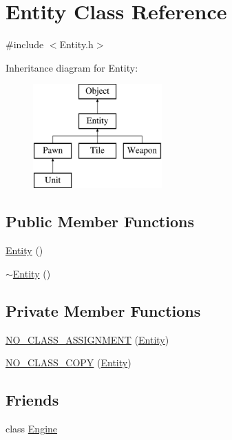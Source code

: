 \section{Entity Class Reference}
\label{class_entity}


{\ttfamily \#include $<$Entity.\-h$>$}

Inheritance diagram for Entity\-:\begin{figure}[H]
\begin{center}
\leavevmode
\includegraphics[height=4.000000cm]{class_entity}
\end{center}
\end{figure}
\subsection*{Public Member Functions}
\begin{DoxyCompactItemize}
\item 
\hyperlink{class_entity_a980f368aa07ce358583982821533a54a}{Entity} ()
\item 
\hyperlink{class_entity_adf6d3f7cb1b2ba029b6b048a395cc8ae}{$\sim$\-Entity} ()
\end{DoxyCompactItemize}
\subsection*{Private Member Functions}
\begin{DoxyCompactItemize}
\item 
\hyperlink{class_entity_add34b9ba572f96f6f9f54440a3b7efc0}{N\-O\-\_\-\-C\-L\-A\-S\-S\-\_\-\-A\-S\-S\-I\-G\-N\-M\-E\-N\-T} (\hyperlink{class_entity}{Entity})
\item 
\hyperlink{class_entity_a9c3fcb6328669644c1b6df5f90cae2f4}{N\-O\-\_\-\-C\-L\-A\-S\-S\-\_\-\-C\-O\-P\-Y} (\hyperlink{class_entity}{Entity})
\end{DoxyCompactItemize}
\subsection*{Friends}
\begin{DoxyCompactItemize}
\item 
class \hyperlink{class_entity_a3e1914489e4bed4f9f23cdeab34a43dc}{Engine}
\end{DoxyCompactItemize}


